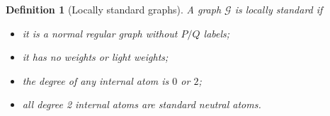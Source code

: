 \documentclass{article}
\newcommand{\1}{\mathds{1}}
\numberwithin{equation}{section}
\newcommand{\al}{\alpha}
\renewcommand{\cal}{\mathcal}
\theoremstyle{plain} %
\newtheorem{definition}[theorem]{Definition}
\theoremstyle{remark}
\newcommand{\cor}{\color{red}}
\newcommand{\cob}{\color{purple}}
\newcommand{\nc}{\normalcolor}
\begin{document}
 \begin{definition} [Locally standard graphs] \label{deflvl1}%
A graph $\cal G$ is  \emph{locally standard}  if 
\begin{itemize}
\item[(i)] it is a normal regular graph without $P/Q$ labels; %



\item[(ii)] it has no weights or light weights;

\item[(iii)] the degree of any internal atom is $0$ or $2$; %

\item[(iv)] all degree 2 internal atoms are \emph{standard neutral atoms}. %



\end{itemize}
 \end{definition}
\end{document}

